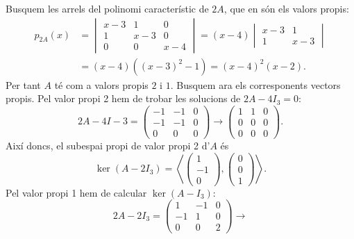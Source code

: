 \documentclass[12pt]{article}
\numberwithin{table}{section}
\numberwithin{figure}{section}
\numberwithin{equation}{section}
\begin{document}
\begin{enumerate}[label=(\alph*), font=\bfseries \sffamily, wide, labelwidth=!, labelindent=0pt]
		Busquem les arrels del polinomi característic de \( 2A \), que en són els valors propis:
		\begin{align*}
			p_{2A}(x) & = \begin{vmatrix}
				x-3 & 1 & 0 \\
				1 & x-3 & 0 \\
				0 & 0 & x-4
			\end{vmatrix}
			= (x-4) \begin{vmatrix}
				x-3 & 1\\
				1 & x-3
			\end{vmatrix} \\
			& = (x-4) \left( (x-3)^2 - 1 \right) = (x-4)^2(x-2). 
		\end{align*}
		Per tant \( A \) té com a valors propis \( 2 \) i \( 1 \). Busquem ara els corresponents vectors propis. Pel valor propi 2 hem de trobar les solucions de \( 2A - 4I_3 = 0 \):  	
		\begin{equation*}
			2A - 4I-3 = \begin{pmatrix}
				-1 & -1 & 0 \\
				-1 & -1 & 0 \\
				0 & 0 & 0
			\end{pmatrix} \to 
			\begin{pmatrix}
				1 & 1 & 0 \\
				0 & 0 & 0 \\
				0 & 0 & 0
			\end{pmatrix} .
		\end{equation*}
		Així doncs, el subespai propi de valor propi 2 d'\( A \) és
		\begin{equation*}
			\ker{(A - 2I_3)} = \left\langle \begin{pmatrix}
					1 \\ -1 \\ 0
					\end{pmatrix}, \begin{pmatrix}
					0 \\ 0 \\ 1 
			\end{pmatrix} \right\rangle .
		\end{equation*}
		Pel valor propi 1 hem de calcular \( \ker{(A - I_3)} \):
		\begin{equation*}
			2A - 2I_3 = \begin{pmatrix}
				1 & -1 & 0 \\
				-1 & 1 & 0 \\
				0 & 0 & 2
			\end{pmatrix} \to

\end{equation*}
\end{enumerate}
\end{document}
